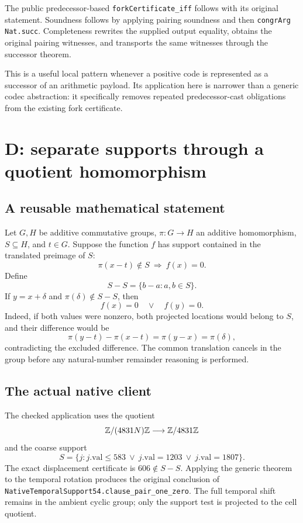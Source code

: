 \documentclass[11pt]{article}
\theoremstyle{remark}\newtheorem{remark}[proposition]{Remark}
\newcommand{\code}[1]{\nolinkurl{#1}}
\begin{document}
The public predecessor-based \code{forkCertificate_iff} follows with its original statement. Soundness follows by applying pairing soundness and then \code{congrArg Nat.succ}. Completeness rewrites the supplied output equality, obtains the original pairing witnesses, and transports the same witnesses through the successor theorem.

This is a useful local pattern whenever a positive code is represented as a successor of an arithmetic payload. Its application here is narrower than a generic codec abstraction: it specifically removes repeated predecessor-cast obligations from the existing fork certificate.

\ForkStatus

\section{D: separate supports through a quotient homomorphism}\label{sec:support}

\subsection{A reusable mathematical statement}

Let \(G,H\) be additive commutative groups, \(\pi:G\to H\) an additive homomorphism, \(S\subseteq H\), and \(t\in G\). Suppose the function \(f\) has support contained in the translated preimage of \(S\):
\[
 \pi(x-t)\notin S\ \Longrightarrow\ f(x)=0.
\]
Define
\[
 S-S=\{b-a:a,b\in S\}.
\]
If \(y=x+\delta\) and \(\pi(\delta)\notin S-S\), then
\[
 f(x)=0\quad\lor\quad f(y)=0.
\]
Indeed, if both values were nonzero, both projected locations would belong to \(S\), and their difference would be
\[
 \pi(y-t)-\pi(x-t)=\pi(y-x)=\pi(\delta),
\]
contradicting the excluded difference. The common translation cancels in the group before any natural-number remainder reasoning is performed.

\subsection{The actual native client}

The checked application uses the quotient
\[
 \mathbb{Z}/(4831N)\mathbb{Z}\longrightarrow\mathbb{Z}/4831\mathbb{Z}
\]
and the coarse support
\[
 S=\{j:j.\mathrm{val}\le583\ \lor\ j.\mathrm{val}=1203\ \lor\ j.\mathrm{val}=1807\}.
\]
The exact displacement certificate is \(606\notin S-S\). Applying the generic theorem to the temporal rotation produces the original conclusion of
\code{NativeTemporalSupport54.clause_pair_one_zero}. The full temporal shift remains in the ambient cyclic group; only the support test is projected to the cell quotient.
\end{document}
